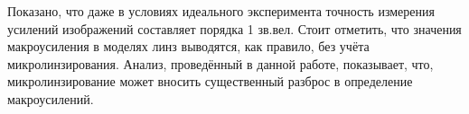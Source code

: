 Показано, что даже в условиях идеального эксперимента точность измерения усилений изображений составляет порядка 1 зв.вел. Стоит отметить, что значения макроусиления в моделях линз выводятся, как правило, без учёта микролинзирования. Анализ, проведённый в данной работе, показывает, что, микролинзирование может вносить существенный разброс в определение макроусилений.



 
